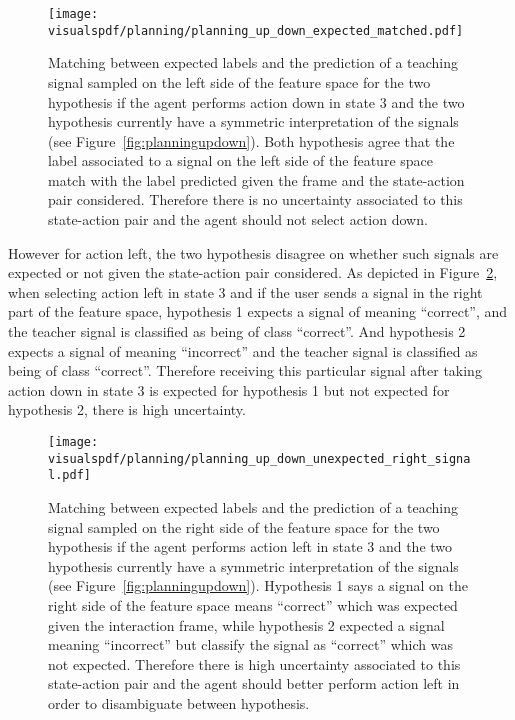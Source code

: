 \begin{figure}[!htbp]
  \centering
  \texttt{[image: \\visualspdf/planning/planning\_up\_down\_expected\_matched.pdf]}
  \caption{Matching between expected labels and the prediction of a teaching signal sampled on the left side of the feature space for the two hypothesis if the agent performs action down in state 3 and the two hypothesis currently have a symmetric interpretation of the signals (see Figure~\ref{fig:planningupdown}). Both hypothesis agree that the label associated to a signal on the left side of the feature space match with the label predicted given the frame and the state-action pair considered. Therefore there is no uncertainty associated to this state-action pair and the agent should not select action down.}
  \label{fig:uncertaintymeaningupdownexpectedleft}
\end{figure}

However for action left, the two hypothesis disagree on whether such signals are expected or not given the state-action pair considered. As depicted in Figure~\ref{fig:uncertaintymeaningupdownunexpectedright}, when selecting action left in state 3 and if the user sends a signal in the right part of the feature space, hypothesis 1 expects a signal of meaning ``correct'', and the teacher signal is classified as being of class ``correct''. And hypothesis 2 expects a signal of meaning ``incorrect'' and the teacher signal is classified as being of class ``correct''. Therefore receiving this particular signal after taking action down in state 3 is expected for hypothesis 1 but not expected for hypothesis 2, there is high uncertainty.

\begin{figure}[!htbp]
  \centering
  \texttt{[image: \\visualspdf/planning/planning\_up\_down\_unexpected\_right\_signal.pdf]}
  \caption{Matching between expected labels and the prediction of a teaching signal sampled on the right side of the feature space for the two hypothesis if the agent performs action left in state 3 and the two hypothesis currently have a symmetric interpretation of the signals (see Figure~\ref{fig:planningupdown}). Hypothesis 1 says a signal on the right side of the feature space means ``correct'' which was expected given the interaction frame, while hypothesis 2 expected a signal meaning ``incorrect'' but classify the signal as ``correct'' which was not expected. Therefore there is high uncertainty associated to this state-action pair and the agent should better perform action left in order to disambiguate between hypothesis.}
  \label{fig:uncertaintymeaningupdownunexpectedright}
\end{figure}

